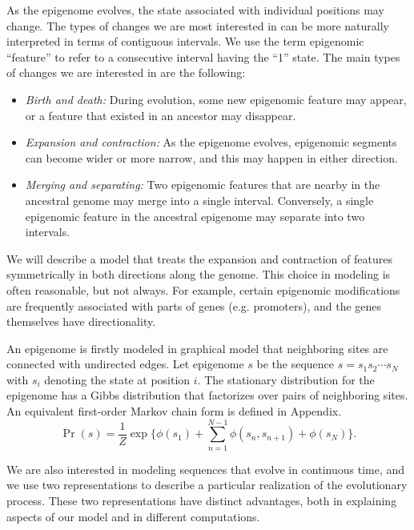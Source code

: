 \documentclass[11pt]{article}
\begin{document}
As the epigenome evolves, the state associated with individual
positions may change. The types of changes we are most interested in
can be more naturally interpreted in terms of contiguous intervals. We
use the term epigenomic ``feature'' to refer to a consecutive interval
having the ``1'' state. The main types of changes we are interested in
are the following:
\begin{itemize}
\item {\it Birth and death:} During evolution, some new epigenomic
  feature may appear, or a feature that existed in an ancestor may
  disappear. %
\item {\it Expansion and contraction:} As the epigenome evolves,
  epigenomic segments can become wider or more narrow, and this may
  happen in either direction.
\item {\it Merging and separating:} Two epigenomic features that are
  nearby in the ancestral genome may merge into a single interval.
  Conversely, a single epigenomic feature in the ancestral epigenome
  may separate into two intervals.
\end{itemize}
We will describe a model that treats the expansion and contraction of
features symmetrically in both directions along the genome.  This
choice in modeling is often reasonable, but not always. For example,
certain epigenomic modifications are frequently associated with parts
of genes (e.g. promoters), and the genes themselves have
directionality.

An epigenome is firstly modeled in graphical model that neighboring sites
are connected with undirected edges.
Let epigenome $s$ be the sequence $s=s_1s_2\cdots s_N$ with $s_i$
denoting the state at position $i$.
The stationary distribution for the epigenome has a Gibbs distribution
that factorizes over pairs of neighboring sites.
An equivalent first-order Markov chain form is defined in Appendix.
\begin{equation}\label{eqn:stationary}
  \Pr(s) = \frac{1}{Z} \exp\big\{\phi(s_1) +\sum_{n=1}^{N-1}\phi(s_n, s_{n+1}) + \phi(s_N)\big\}.
\end{equation}


We are also interested in modeling sequences that evolve in continuous
time, and we use two representations to describe a particular
realization of the evolutionary process. These two representations
have distinct advantages, both in explaining aspects of our model and
in different computations.
\end{document}
